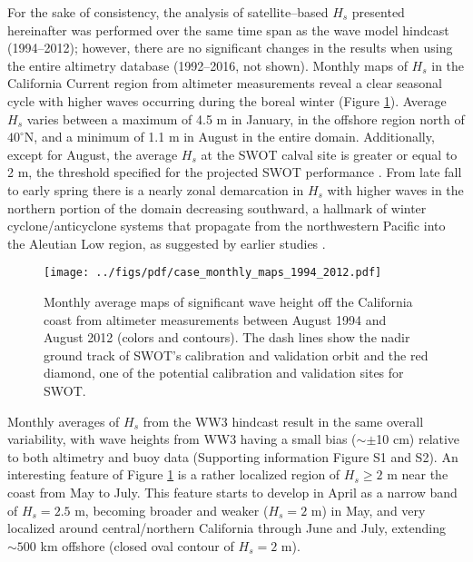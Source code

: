 For the sake of consistency, the analysis of satellite--based $H_s$ presented hereinafter was performed over the same time span as the wave model hindcast (1994--2012); however, there are no significant changes in the results when using the entire altimetry database (1992--2016, not shown). 
Monthly maps of $H_s$ in the California Current region from altimeter measurements reveal a clear seasonal cycle with higher waves occurring during the boreal winter (Figure \ref{monthly_swh}). 
Average $H_s$ varies between a maximum of 4.5 m in January, in the offshore region north of $40^\circ$N, and a minimum of 1.1 m in August in the entire domain. 
Additionally, except for August, the average $H_s$ at the SWOT calval site is greater or equal to 2 m, the threshold specified for the projected SWOT performance \citep{peral2015impact}. 
From late fall to early spring there is a nearly zonal demarcation in $H_s$ with higher waves in the northern portion of the domain decreasing southward, a hallmark of winter cyclone/anticyclone systems that propagate from the northwestern Pacific into the Aleutian Low region, as suggested by earlier studies \citep[e.g.,][]{adams2008southern, bromirski2005wave, bromirski2013wave}. 
\begin{figure}[htb]
\centering
\texttt{[image: ../figs/pdf/case\_monthly\_maps\_1994\_2012.pdf]}
\caption{Monthly average maps of significant wave height off the California coast from altimeter measurements between August 1994 and August 2012 (colors and contours). The dash lines show the nadir ground track of SWOT's calibration and validation orbit and the red diamond, one of the potential calibration and validation sites for SWOT.}
\label{monthly_swh}
\end{figure}
\noindent Monthly averages of $H_s$ from the WW3 hindcast result in the same overall variability, with wave heights from WW3 having a small bias ($\sim \pm$10 cm) relative to both altimetry and buoy data (Supporting information Figure S1 and S2). 
An interesting feature of Figure \ref{monthly_swh} is a rather localized region of $H_s \geq 2$ m near the coast from May to July. This feature starts to develop in April as a narrow band of $H_s=2.5$ m, becoming broader and weaker ($H_s = 2$ m) in May, and very localized around central/northern California through June and July, extending $\sim 500$ km offshore (closed oval contour of $H_s = 2$ m).


